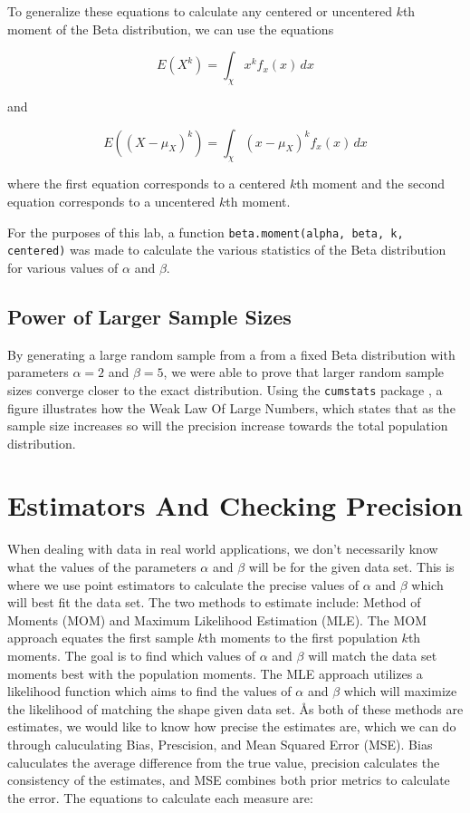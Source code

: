 \documentclass{article}\usepackage[]{graphicx}\usepackage[]{xcolor}
\begin{document}
\begin{multicols}{2}
To generalize these equations to calculate any centered or uncentered $k$th moment of the Beta distribution, we can use the equations

\[E(X^{k}) = \int_{\chi}^{} x^{k}f_x(x) \,dx \]
\begin{center}
and 
\end{center}
\[E((X-\mu_X)^{k}) = \int_{\chi}^{} (x-\mu_X)^{k}f_x(x) \,dx \]

where the first equation corresponds to a centered $k$th moment and the second equation corresponds to a uncentered $k$th moment.

For the purposes of this lab, a function \verb|beta.moment(alpha, beta, k, centered)| was made to calculate the various statistics of the Beta distribution for various values of $\alpha$ and $\beta$.

\subsection{Power of Larger Sample Sizes}
By generating a large random sample from a from a fixed Beta distribution with parameters $\alpha = 2$ and $\beta = 5$, we were able to prove that larger random sample sizes converge closer to the exact distribution. Using the \texttt{cumstats} package \cite{cumstats}, a figure illustrates how the Weak Law Of Large Numbers, which states that as the sample size increases so will the precision increase towards the total population distribution.

\section{Estimators And Checking Precision}
When dealing with data in real world applications, we don't necessarily know what the values of the parameters $\alpha$ and $\beta$ will be for the given data set. This is where we use point estimators to calculate the precise values of $\alpha$ and $\beta$ which will best fit the data set. The two methods to estimate include: Method of Moments (MOM) and Maximum Likelihood Estimation (MLE). The MOM approach equates the first sample $k$th moments to the first population $k$th moments. The goal is to find which values of $\alpha$ and $\beta$ will match the data set moments best with the population moments. The MLE approach utilizes a likelihood function which aims to find the values of $\alpha$ and $\beta$ which will maximize the likelihood of matching the shape given data set. Ås both of these methods are estimates, we would like to know how precise the estimates are, which we can do through caluculating Bias, Prescision, and Mean Squared Error (MSE). Bias caluculates the average difference from the true value, precision calculates the consistency of the estimates, and MSE combines both prior metrics to calculate the error. The equations to calculate each measure are:


\end{multicols}
\end{document}
